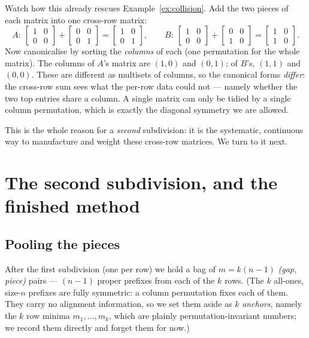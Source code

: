 \documentclass[11pt,a4paper]{article}
\theoremstyle{definition}
\theoremstyle{plain}
\begin{document}
Watch how this already rescues Example~\ref{ex:collision}. Add the two pieces
of each matrix into one cross-row matrix:
\[
   A:\ \begin{bmatrix}1&0\\0&0\end{bmatrix}+\begin{bmatrix}0&0\\0&1\end{bmatrix}
      =\begin{bmatrix}1&0\\0&1\end{bmatrix},
   \qquad
   B:\ \begin{bmatrix}1&0\\0&0\end{bmatrix}+\begin{bmatrix}0&0\\1&0\end{bmatrix}
      =\begin{bmatrix}1&0\\1&0\end{bmatrix}.
\]
Now canonicalise by sorting the \emph{columns} of each (one permutation for the
whole matrix). The columns of $A$'s matrix are $(1,0)$ and $(0,1)$; of $B$'s,
$(1,1)$ and $(0,0)$. These are different as multisets of columns, so the
canonical forms \emph{differ}: the cross-row sum sees what the per-row data
could not --- namely whether the two top entries share a column. A single matrix
can only be tidied by a single column permutation, which is exactly the diagonal
symmetry we are allowed.

\medskip\noindent
This is the whole reason for a \emph{second} subdivision: it is the systematic,
continuous way to manufacture and weight these cross-row matrices. We turn to it
next.

\section{The second subdivision, and the finished method}
\label{sec:second}

\subsection{Pooling the pieces}

After the first subdivision (one per row) we hold a bag of $m=k(n-1)$
\emph{(gap, piece)} pairs --- $(n-1)$ proper prefixes from each of the $k$ rows.
(The $k$ all-ones, size-$n$ prefixes are fully symmetric: a column permutation
fixes each of them. They carry no alignment information, so we set them aside as
$k$ \emph{anchors}, namely the $k$ row minima $m_1,\dots,m_k$, which are
plainly permutation-invariant numbers; we record them directly and forget them
for now.)
\end{document}

